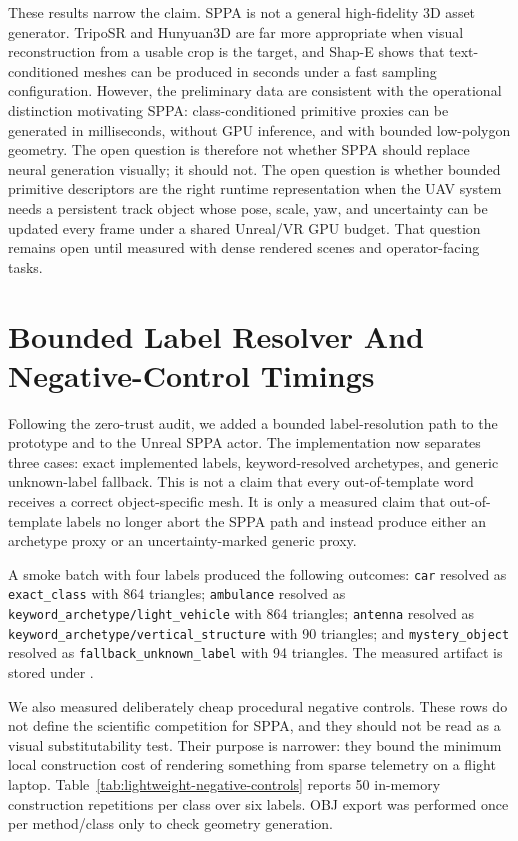 ﻿\documentclass[11pt,a4paper]{article}
\begin{document}
These results narrow the claim. SPPA is not a general high-fidelity 3D asset
generator. TripoSR and Hunyuan3D are far more appropriate when visual
reconstruction from a usable crop is the target, and Shap-E shows that
text-conditioned meshes can be produced in seconds under a fast sampling
configuration. However, the preliminary data are consistent with the operational
distinction motivating SPPA: class-conditioned primitive proxies can be generated
in milliseconds, without GPU inference, and with bounded low-polygon geometry.
The open question is therefore not whether SPPA should replace neural generation
visually; it should not. The open question is whether bounded primitive
descriptors are the right runtime representation when the UAV system needs a
persistent track object whose pose, scale, yaw, and uncertainty can be updated
every frame under a shared Unreal/VR GPU budget. That question remains open
until measured with dense rendered scenes and operator-facing tasks.


\section{Bounded Label Resolver And Negative-Control Timings}

Following the zero-trust audit, we added a bounded label-resolution path to the
prototype and to the Unreal SPPA actor. The implementation now separates
three cases: exact implemented labels, keyword-resolved archetypes, and generic
unknown-label fallback. This is not a claim that every out-of-template word receives
a correct object-specific mesh. It is only a measured claim that out-of-template
labels no longer abort the SPPA path and instead produce either an archetype
proxy or an uncertainty-marked generic proxy.

A smoke batch with four labels produced the following outcomes: \texttt{car}
resolved as \texttt{exact\_class} with 864 triangles; \texttt{ambulance}
resolved as \texttt{keyword\_archetype/light\_vehicle} with 864 triangles;
\texttt{antenna} resolved as \texttt{keyword\_archetype/vertical\_structure}
with 90 triangles; and \texttt{mystery\_object} resolved as
\texttt{fallback\_unknown\_label} with 94 triangles. The measured artifact is
stored under .

We also measured deliberately cheap procedural negative controls. These rows do
not define the scientific competition for SPPA, and they should not be read as a
visual substitutability test. Their purpose is narrower: they bound the
minimum local construction cost of rendering something from sparse telemetry on
a flight laptop. Table~\ref{tab:lightweight-negative-controls} reports 50
in-memory construction repetitions per class over six labels. OBJ export was
performed once per method/class only to check geometry generation.
\end{document}
